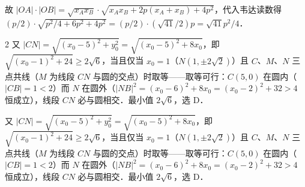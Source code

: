 \documentclass[fontset=none]{ctexart}
\begin{document}
故 \(|OA|\cdot|OB|=\sqrt{x_{A}x_{B}}\cdot\sqrt{x_{A}x_{B}+2p(x_{A}+x_{B})+4p^{2}}\)，代入韦达读数得 \((p/2)\cdot\sqrt{p^{2}/4+6p^{2}+4p^{2}}=(p/2)\cdot(\sqrt{41}/2)p=\sqrt{41}p^{2}/4\)．

\begin{multicols}{2}
又 \(|CN|=\sqrt{(x_{0}-5)^{2}+y_{0}^{2}}=\sqrt{(x_{0}-5)^{2}+8x_{0}}\)，即 \(\sqrt{(x_{0}-1)^{2}+24}\geqslant 2\sqrt{6}\)，当且仅当 \(x_{0}=1\)（\(N(1,\pm 2\sqrt{2})\)）且 \(C\)、\(M\)、\(N\) 三点共线（\(M\) 为线段 \(CN\) 与圆的交点）时取等——取等可行：\(C(5,0)\) 在圆内（\(|CB|=1<2\)）而 \(N\) 在圆外（\(|NB|^{2}=(x_{0}-6)^{2}+8x_{0}=(x_{0}-2)^{2}+32>4\) 恒成立），线段 \(CN\) 必与圆相交．最小值 \(2\sqrt{6}\)，选 D．
{\ansblockgrayfalse
\begin{ansblock}[probe-v3]
又 \(|CN|=\sqrt{(x_{0}-5)^{2}+y_{0}^{2}}=\sqrt{(x_{0}-5)^{2}+8x_{0}}\)，即 \(\sqrt{(x_{0}-1)^{2}+24}\geqslant 2\sqrt{6}\)，当且仅当 \(x_{0}=1\)（\(N(1,\pm 2\sqrt{2})\)）且 \(C\)、\(M\)、\(N\) 三点共线（\(M\) 为线段 \(CN\) 与圆的交点）时取等——取等可行：\(C(5,0)\) 在圆内（\(|CB|=1<2\)）而 \(N\) 在圆外（\(|NB|^{2}=(x_{0}-6)^{2}+8x_{0}=(x_{0}-2)^{2}+32>4\) 恒成立），线段 \(CN\) 必与圆相交．最小值 \(2\sqrt{6}\)，选 D．
\end{ansblock}}
\end{multicols}
\end{document}
